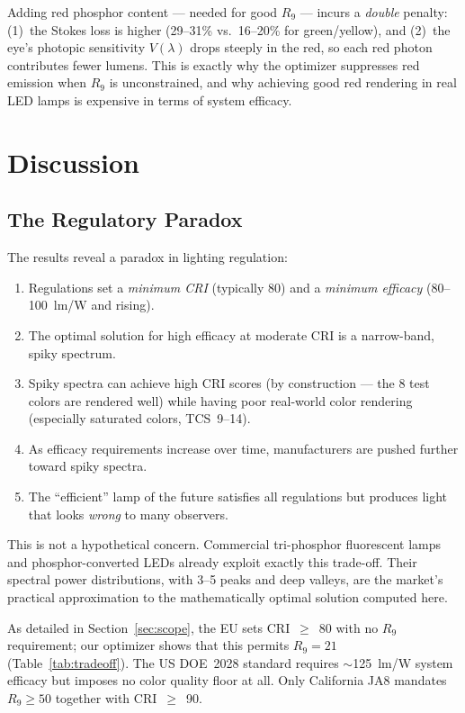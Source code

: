 \documentclass[11pt]{article}
\begin{document}
Adding red phosphor content --- needed for good $R_9$ --- incurs a
\emph{double} penalty: (1)~the Stokes loss is higher (29--31\% vs.\ 16--20\%
for green/yellow), and (2)~the eye's photopic sensitivity $V(\lambda)$ drops
steeply in the red, so each red photon contributes fewer lumens.
This is exactly why the optimizer suppresses red emission when $R_9$
is unconstrained, and why achieving good red rendering in real LED lamps
is expensive in terms of system efficacy.

\section{Discussion}

\subsection{The Regulatory Paradox}

The results reveal a paradox in lighting regulation:

\begin{enumerate}
\item Regulations set a \emph{minimum CRI} (typically 80) and a
      \emph{minimum efficacy} (80--100~lm/W and rising).
\item The optimal solution for high efficacy at moderate CRI is a
      narrow-band, spiky spectrum.
\item Spiky spectra can achieve high CRI scores (by construction ---
      the 8 test colors are rendered well) while having poor real-world
      color rendering (especially saturated colors, TCS~9--14).
\item As efficacy requirements increase over time, manufacturers are
      pushed further toward spiky spectra.
\item The ``efficient'' lamp of the future satisfies all regulations
      but produces light that looks \emph{wrong} to many observers.
\end{enumerate}

This is not a hypothetical concern.  Commercial tri-phosphor fluorescent
lamps and phosphor-converted LEDs already exploit exactly this trade-off.
Their spectral power distributions, with 3--5 peaks and deep valleys, are
the market's practical approximation to the mathematically optimal solution
computed here.

As detailed in Section~\ref{sec:scope}, the EU sets CRI~$\geq$~80
with no $R_9$ requirement; our optimizer shows that this permits $R_9 = 21$
(Table~\ref{tab:tradeoff}).  The US DOE~2028 standard requires
$\sim$125~lm/W system efficacy but imposes no color quality floor at all.
Only California JA8 mandates $R_9 \geq 50$ together with CRI~$\geq$~90.
\end{document}
